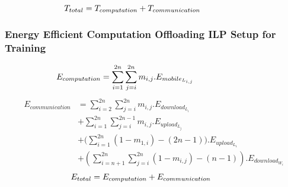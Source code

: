\begin{equation}
T_{total} = T_{computation} + T_{communication}\thinspace\thinspace\thinspace\thinspace\thinspace\thinspace\thinspace\thinspace\thinspace\thinspace\thinspace\thinspace\thinspace\thinspace\thinspace\thinspace\thinspace\thinspace\thinspace\thinspace\thinspace\thinspace\thinspace\thinspace\thinspace\thinspace\thinspace\thinspace\thinspace\thinspace\thinspace
\end{equation}

\subsubsection{Energy Efficient Computation Offloading ILP Setup for Training}
  \begin{equation}
      \begin{split}
E_{computation} &= \sum_{i=1}^{2n}{\sum_{j=i}^{2n}{
m_{i,j}.E_{mobile_{L_{i,j}}}}\thinspace\thinspace\thinspace\thinspace\thinspace\thinspace\thinspace\thinspace\thinspace\thinspace\thinspace\thinspace\thinspace\thinspace\thinspace\thinspace\thinspace\thinspace\thinspace\thinspace\thinspace\thinspace\thinspace\thinspace\thinspace\thinspace\thinspace\thinspace\thinspace\thinspace\thinspace\thinspace\thinspace\thinspace\thinspace\thinspace}\label{eq: energy_comp_train}
  \end{split}
\end{equation}
  \begin{equation}
      \begin{split}
E_{communication} &= \sum_{i=2}^{2n}{\sum_{j=i}^{2n}{m_{i,j}.E_{download_{L_i}}}} \\
& + \sum_{i=1}^{2n}{\sum_{j=i}^{2n-1}{m_{i,j}.E_{upload_{L_j}}}} \\
& + (\sum_{i=1}^{2n}{(1-m_{1,i}) - (2n-1)).E_{upload_{L_1}}} \\
& + (\sum_{i=n+1}^{2n}\sum_{j=i}^{2n}{(1-m_{i,j}) - (n-1)}).E_{download_{W_{i}}}\label{eq: energy_comm_train}
  \end{split}
\end{equation}
  \begin{equation}
E_{total} = E_{computation} + E_{communication}\thinspace\thinspace\thinspace\thinspace\thinspace\thinspace\thinspace\thinspace\thinspace\thinspace\thinspace\thinspace\thinspace\thinspace\thinspace\thinspace\thinspace\thinspace\thinspace
\end{equation}

